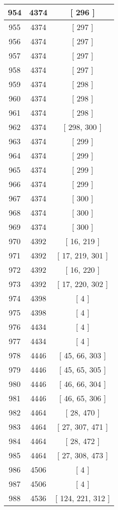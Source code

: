 \begin{center}
\begin{longtable}[H]{|| c c c ||}
\hline
954 & 4374 & [ 296 ] \\ 
\hline
955 & 4374 & [ 297 ] \\ 
\hline
956 & 4374 & [ 297 ] \\ 
\hline
957 & 4374 & [ 297 ] \\ 
\hline
958 & 4374 & [ 297 ] \\ 
\hline
959 & 4374 & [ 298 ] \\ 
\hline
960 & 4374 & [ 298 ] \\ 
\hline
961 & 4374 & [ 298 ] \\ 
\hline
962 & 4374 & [ 298, 300 ] \\ 
\hline
963 & 4374 & [ 299 ] \\ 
\hline
964 & 4374 & [ 299 ] \\ 
\hline
965 & 4374 & [ 299 ] \\ 
\hline
966 & 4374 & [ 299 ] \\ 
\hline
967 & 4374 & [ 300 ] \\ 
\hline
968 & 4374 & [ 300 ] \\ 
\hline
969 & 4374 & [ 300 ] \\ 
\hline
970 & 4392 & [ 16, 219 ] \\ 
\hline
971 & 4392 & [ 17, 219, 301 ] \\ 
\hline
972 & 4392 & [ 16, 220 ] \\ 
\hline
973 & 4392 & [ 17, 220, 302 ] \\ 
\hline
974 & 4398 & [ 4 ] \\ 
\hline
975 & 4398 & [ 4 ] \\ 
\hline
976 & 4434 & [ 4 ] \\ 
\hline
977 & 4434 & [ 4 ] \\ 
\hline
978 & 4446 & [ 45, 66, 303 ] \\ 
\hline
979 & 4446 & [ 45, 65, 305 ] \\ 
\hline
980 & 4446 & [ 46, 66, 304 ] \\ 
\hline
981 & 4446 & [ 46, 65, 306 ] \\ 
\hline
982 & 4464 & [ 28, 470 ] \\ 
\hline
983 & 4464 & [ 27, 307, 471 ] \\ 
\hline
984 & 4464 & [ 28, 472 ] \\ 
\hline
985 & 4464 & [ 27, 308, 473 ] \\ 
\hline
986 & 4506 & [ 4 ] \\ 
\hline
987 & 4506 & [ 4 ] \\ 
\hline
988 & 4536 & [ 124, 221, 312 ] \\ 

\end{longtable}
\end{center}
